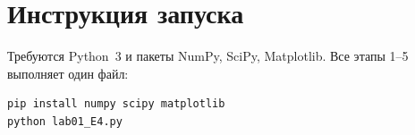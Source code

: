 \documentclass[12pt]{article}
\begin{document}
\appendix

\section*{Инструкция запуска}

Требуются Python~3 и пакеты NumPy, SciPy, Matplotlib. Все этапы 1--5 выполняет один файл:
\begin{Verbatim}[fontsize=\small]
pip install numpy scipy matplotlib
python lab01_E4.py
\end{Verbatim}



\end{document}

